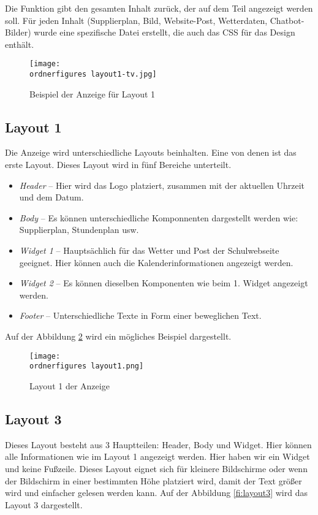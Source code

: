 Die Funktion gibt den gesamten Inhalt zurück, der auf dem Teil angezeigt werden soll. Für jeden Inhalt (Supplierplan, Bild, Website-Post, Wetterdaten, Chatbot-Bilder) wurde eine spezifische Datei erstellt, die auch das CSS für das Design enthält.

\begin{figure}[H]
	\centering
	\texttt{[image: \\ordnerfigures layout1-tv.jpg]}
	\caption{Beispiel der Anzeige für Layout 1}
	\label{fi:beispiel}
\end{figure}


\subsection{Layout 1}
Die Anzeige wird unterschiedliche Layouts beinhalten. Eine von denen ist das erste Layout. Dieses Layout wird in fünf Bereiche unterteilt.

\begin{itemize}
	\item \textit{Header} – Hier wird das Logo platziert, zusammen mit der aktuellen Uhrzeit und dem Datum.
	\item \textit{Body} – Es können unterschiedliche Komponnenten dargestellt werden wie: Supplierplan, Stundenplan usw.
	\item \textit{Widget 1} – Hauptsächlich für das Wetter und Post der Schulwebseite geeignet. Hier können auch die Kalenderinformationen angezeigt werden.
	\item \textit{Widget 2} – Es können dieselben Komponenten wie beim 1. Widget angezeigt werden.
	\item \textit{Footer} – Unterschiedliche Texte in Form einer beweglichen Text.
	
\end{itemize}

Auf der Abbildung \ref{fi:layout1} wird ein mögliches Beispiel dargestellt.

\begin{figure}[H]
	\centering
	\texttt{[image: \\ordnerfigures layout1.png]}
	\caption{Layout 1 der Anzeige}
	\label{fi:layout1}
\end{figure}

\subsection{Layout 3}
Dieses Layout besteht aus 3 Hauptteilen: Header, Body und Widget. Hier können alle Informationen wie im Layout 1 angezeigt werden. Hier haben wir ein Widget und keine Fußzeile. Dieses Layout eignet sich für kleinere Bildschirme oder wenn der Bildschirm in einer bestimmten Höhe platziert wird, damit der Text größer wird und einfacher gelesen werden kann. Auf der Abbildung \ref{fi:layout3} wird das Layout 3 dargestellt.

